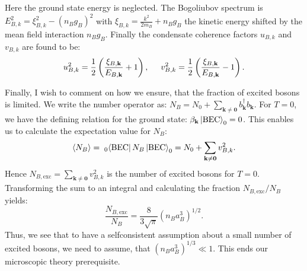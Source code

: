 Here the ground state energy is neglected. The Bogoliubov spectrum is $E_{B,k}^2 = \xi_{B,k}^2-(n_Bg_B)^2$ with $\xi_{B,k} = \frac{k^2}{2m_B}+n_Bg_B$ the kinetic energy shifted by the mean field interaction $n_Bg_B$. Finally the condensate coherence factors $u_{B,k}$ and $v_{B,k}$ are found to be: 
\begin{equation}
u_{B,k}^2 = \frac{1}{2}\left(\frac{\xi_{B,\mathbf{k}}}{ E_{B,\mathbf{k}}}+1 \right), \hspace{0.5cm} v_{B,k}^2 = \frac{1}{2}\left(\frac{\xi_{B,\mathbf{k}}}{ E_{B,\mathbf{k}}}-1 \right).
\end{equation}

Finally, I wish to comment on how we ensure, that the fraction of excited bosons is limited. We write the number operator as: $N_B = N_0 + \sum_{\mathbf{k}\neq \mathbf{0}} b^\dagger_{\mathbf{k}}b_{\mathbf{k}}$. For $T=0$, we have the defining relation for the ground state: $\beta_{\mathbf{k}}\ket{\text{BEC}}_0 = 0$. This enables us to calculate the expectation value for $N_B$:
\begin{equation}
\braket{N_B} = \; _{0}\!\bra{\text{BEC}} N_B \ket{\text{BEC}}_0 = N_0 + \sum_{\mathbf{k}\neq \mathbf{0}} v^2_{B,k}.\nonumber
\end{equation} 
Hence $N_{B,\text{exc}} = \sum_{\mathbf{k}\neq \mathbf{0}} v^2_{B,k}$ is the number of excited bosons for $T=0$. Transforming the sum to an integral and calculating the fraction $N_{B,\text{exc}}/N_B$ yields:
\begin{equation}
\frac{N_{B,\text{exc}}}{N_B} = \frac{8}{3\sqrt{\pi}}(n_Ba_B^3)^{1/2}.
\label{eq.excitedbosonsBEC}
\end{equation}
Thus, we see that to have a selfconsistent assumption about a small number of excited bosons, we need to assume, that $(n_Ba_B^3)^{1/3}\ll 1$. This ends our microscopic theory prerequisite. 

